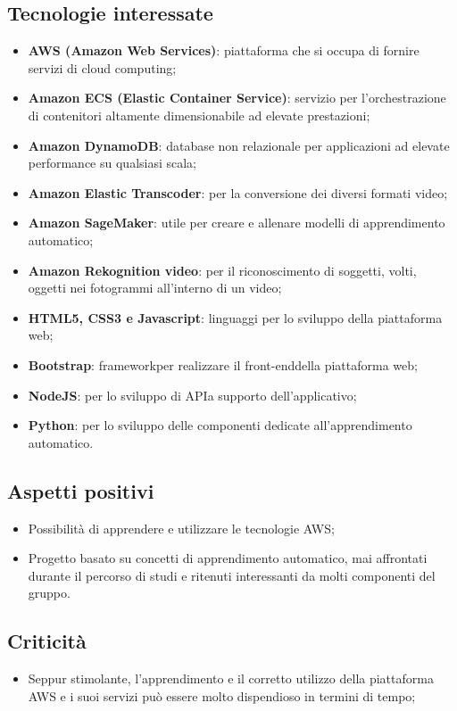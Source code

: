\subsection{Tecnologie interessate}
\begin{itemize}
	\item \textbf{AWS (Amazon Web Services)}: piattaforma che si occupa di fornire servizi di cloud computing;
	\item \textbf{Amazon ECS (Elastic Container Service)}: servizio per l'orchestrazione di contenitori altamente dimensionabile ad elevate	prestazioni;
	\item \textbf{Amazon DynamoDB}:  database non relazionale per applicazioni ad elevate performance su qualsiasi scala;
	\item \textbf{Amazon Elastic Transcoder}: per la conversione dei diversi formati video;
	\item \textbf{Amazon SageMaker}: utile per creare e allenare modelli di apprendimento automatico\glos;
	\item \textbf{Amazon Rekognition video}: per il riconoscimento di soggetti, volti, oggetti nei fotogrammi all'interno di un video;
	\item \textbf{HTML5, CSS3 e Javascript}: linguaggi per lo sviluppo della piattaforma web;
	\item \textbf{Bootstrap}: framework\glo per realizzare il front-end\glo della piattaforma web;
	\item \textbf{NodeJS}: per lo sviluppo di API\glo a supporto dell'applicativo;
	\item \textbf{Python}: per lo sviluppo delle componenti dedicate all'apprendimento automatico\glos.
\end{itemize}

\subsection{Aspetti positivi}
\begin{itemize}
	\item Possibilità di apprendere e utilizzare le tecnologie AWS;
	\item Progetto basato su concetti di apprendimento automatico\glos, mai affrontati durante il percorso di studi e ritenuti interessanti da molti componenti del gruppo.
\end{itemize}

\subsection{Criticità}
\begin{itemize}
	\item Seppur stimolante, l'apprendimento e il corretto utilizzo della piattaforma AWS e i suoi servizi può essere molto dispendioso in termini di tempo;
	
\end{itemize}


